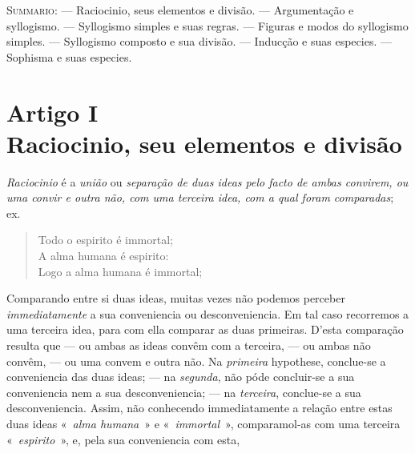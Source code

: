 {\small\noindent\textsc{Summario}: --- Raciocinio, seus elementos e divisão. ---
Argumentação e syllogismo. --- Syllogismo simples e suas regras. --- Figuras e modos do
syllogismo simples. --- Syllogismo composto e sua divisão. --- Inducção e suas especies.
--- Sophisma e suas especies.\par}

\section*{Artigo I\\ Raciocinio, seu elementos e divisão}

 \emph{Raciocinio} é a \emph{união} ou \emph{separação de duas ideas
pelo facto de ambas convirem, ou uma convir e outra não, com uma terceira idea, com a qual
foram comparadas}; ex.
\begin{quote}\small
Todo o espirito é immortal;\\
A alma humana é espirito:\\
Logo a alma humana é immortal;
\end{quote}
Comparando entre si duas ideas, muitas vezes não podemos perceber \emph{immediatamente} a
sua conveniencia ou desconveniencia. Em tal caso recorremos a uma terceira idea,
para com ella comparar as duas primeiras. D'esta comparação resulta que --- ou ambas as
ideas convêm com a terceira, --- ou ambas não convêm, --- ou uma convem e outra não. Na
\emph{primeira} hypothese, conclue-se a conveniencia das duas ideas; --- na
\emph{segunda}, não póde concluir-se a sua conveniencia nem a sua desconveniencia; --- na
\emph{terceira}, conclue-se a sua desconveniencia. Assim, não conhecendo immediatamente a
relação entre estas duas ideas «~\emph{alma humana}~» e «~\emph{immortal}~»,
comparamol-as com uma terceira «~\emph{espirito}~», e, pela sua conveniencia com esta,
